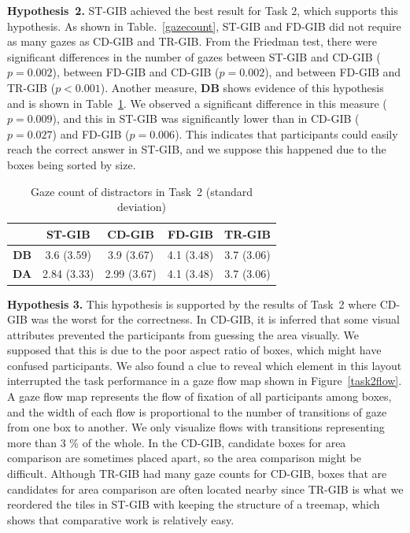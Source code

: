 \documentclass[review]{vgtc}                 %
\begin{document}
{\bf Hypothesis~2.} ST-GIB achieved the best result for Task 2, which supports this hypothesis. As shown in Table.~\ref{gazecount}, ST-GIB and FD-GIB did not require as many gazes as CD-GIB and TR-GIB. From the Friedman test, there were significant differences in the number of gazes between ST-GIB and CD-GIB ($p=0.002$), between FD-GIB and CD-GIB ($p=0.002$), and between FD-GIB and TR-GIB ($p<0.001$). Another measure, {\bf DB} shows evidence of this hypothesis and is shown in Table~\ref{table-dist2}. We observed a significant difference in this measure ($p=0.009$), and this in ST-GIB was significantly lower than in CD-GIB ($p=0.027$) and FD-GIB ($p=0.006$). This indicates that participants could easily reach the correct answer in ST-GIB, and we suppose this happened due to the boxes being sorted by size.

\begin{table}[b]
  \begin{center}
   \caption{Gaze count of distractors in Task~2 (standard deviation)}
  \label{table-dist2}
    \begin{tabular}{|c|c|c|c|c|} \hline
      & ST-GIB & CD-GIB & FD-GIB & TR-GIB \\ \hline
      {\bf DB} & 3.6 (3.59) & 3.9 (3.67) & 4.1 (3.48) & 3.7 (3.06) \\ \hline
      {\bf DA}  & 2.84 (3.33) & 2.99 (3.67) & 4.1 (3.48) & 3.7 (3.06) \\ \hline
    \end{tabular}
  \end{center}
\end{table}

{\bf Hypothesis 3.} This hypothesis is supported by the results of Task~2 where CD-GIB was the worst for the correctness. In CD-GIB, it is inferred that some visual attributes prevented the participants from guessing the area visually.
We supposed that this is due to the poor aspect ratio of boxes, which might have confused participants. We also found a clue to reveal which element in this layout interrupted the task performance in a gaze flow map shown in Figure~\ref{task2flow}.
A gaze flow map represents the flow of fixation of all participants among boxes, and the width of each flow is proportional to the number of transitions of gaze from one box to another. We only visualize flows with transitions representing more than 3 \% of the whole. In the CD-GIB, candidate boxes for area comparison are sometimes placed apart, so the area comparison might be difficult.
Although TR-GIB had many gaze counts for CD-GIB, boxes that are candidates for area comparison are often located nearby since TR-GIB is what we reordered the tiles in ST-GIB with keeping the structure of a treemap, which shows that comparative work is relatively easy.
\end{document}
